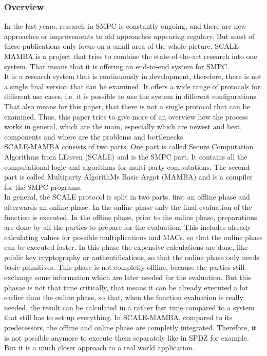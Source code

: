 \documentclass[english,runningheads,a4paper]{llncs}[2018/03/10]
\begin{document}
\subsubsection{Overview}

In the last years, research in SMPC is constantly ongoing, and there are new approaches or improvements to old approaches appearing regulary. But most of these publications only focus on a small area of the whole picture. SCALE-MAMBA\cite{ScaleMambaDocu} is a project that tries to combine the state-of-the-art research into one system. That means that it is offering an end-to-end system for SMPC.\\
It is a research system that is continuously in development, therefore, there is not a single final version that can be examined. It offers a wide range of protocols for different use cases, i.e. it is possible to use the system in different configurations. That also means for this paper, that there is not a single protocol that can be examined. Thus, this paper tries to give more of an overview how the process works in general, which are the main, especially which are newest and best, components and where are the problems and bottlenecks.\\ 
SCALE-MAMBA consists of two parts. One part is called Secure Computation Algorithms from LEuven (SCALE) and is the SMPC part. It contains all the computational logic and algorithms for multi-party computations. The second part is called Multiparty AlgorithMs Basic Argot (MAMBA) and is a compiler for the SMPC programs.\\
 
In general, the SCALE protocol is split in two parts, first an offline phase and afterwards an online phase. In the online phase only the final evaluation of the function is executed. In the offline phase, prior to the online phase, preparations are done by all the parties to prepare for the evaluation. This includes already calculating values for possible multiplications and MACs, so that the online phase can be executed faster. In this phase the expensive calculations are done, like public key cryptography or authentifications, so that the online phase only needs basic primitives. This phase is not completly offline, because the parties still exchange some information which are later needed for the evaluation. But this phasae is not that time critically, that means it can be already executed a lot earlier than the online phase, so that, when the function evaluation is really needed, the result can be calculated in a rather fast time compared to a system that still has to set up everything. In SCALE-MAMBA, compared to its predecessors, the offline and online phase are completly integrated. Therefore, it is not possible anymore to execute them separately like in SPDZ for example. But it is a much closer approach to a real world application.\\
\end{document}
